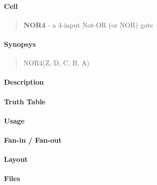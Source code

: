 \label{NOR4}
\paragraph{Cell}
\begin{quote}
    \textbf{NOR4} - a 4-input Not-OR (or NOR) gate
\end{quote}

\paragraph{Synopsys}
\begin{quote}
    NOR4(Z, D, C, B, A)
\end{quote}

\paragraph{Description}

%

\paragraph{Truth Table}
%

\paragraph{Usage}

\paragraph{Fan-in / Fan-out}

\paragraph{Layout}

\paragraph{Files}

